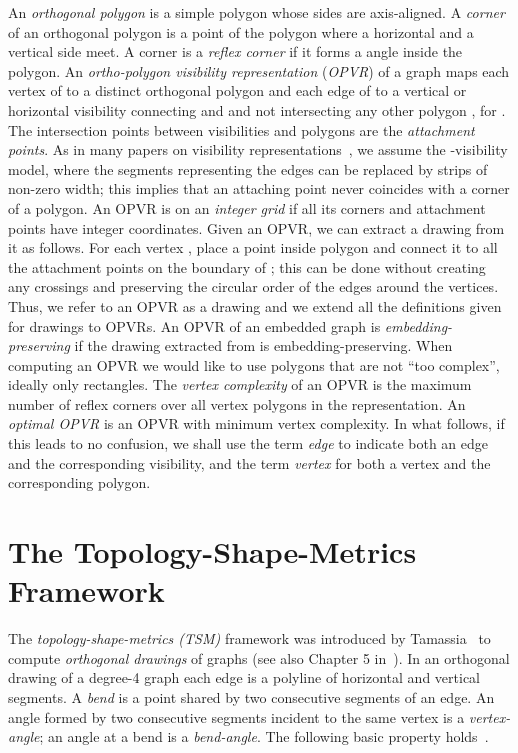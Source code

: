 \documentclass{article}
\newcommand{\opvr}{OPVR\xspace}
\begin{document}
An \emph{orthogonal polygon} is a simple polygon whose sides are axis-aligned. A \emph{corner} of an orthogonal polygon is a point of the polygon where a horizontal and a vertical side meet. A corner is a \emph{reflex corner} if it forms a  angle inside the polygon. An \emph{ortho-polygon visibility representation} (\emph{\opvr}) of a graph  maps each vertex  of  to a distinct orthogonal polygon  and each edge  of  to a vertical or horizontal visibility connecting  and  and not intersecting any other polygon , for . The intersection points between visibilities and polygons are the \emph{attachment points}. As in many papers on visibility representations~\cite{DBLP:journals/ipl/KantLTT97,DBLP:conf/stacs/StreinuW03,TamassiaTollis86,DBLP:conf/compgeom/Wismath85}, we assume the -visibility model, where the segments representing the edges can be replaced by strips of non-zero width; this implies that an attaching point never coincides with a corner of a polygon. An \opvr is on an \emph{integer grid} if all its corners and attachment points have integer coordinates.
Given an \opvr, we can extract a drawing from it as follows. For each vertex , place a point inside polygon  and connect it to all the attachment points on the boundary of ; this can be done without creating any crossings and preserving the circular order of the edges around the vertices. Thus, we refer to an \opvr as a drawing and we extend all the definitions given for drawings to {\opvr}s. An \opvr  of an embedded graph is \emph{embedding-preserving} if the drawing extracted from  is embedding-preserving. 
When computing an \opvr we would like to use polygons that are not ``too complex'', ideally only rectangles. 
The \emph{vertex complexity} of an \opvr is the maximum number of reflex corners over all vertex polygons in the representation. An \emph{optimal \opvr} is an \opvr with minimum vertex complexity. In what follows, if this leads to no confusion, we shall use the term \emph{edge} to indicate both an edge and the corresponding visibility, and the term \emph{vertex} for both a vertex and the corresponding polygon.      

\section{The Topology-Shape-Metrics Framework}\label{se:tsm}

The \emph{topology-shape-metrics (TSM)} framework was introduced by Tamassia~\cite{t-eggmnb-87} to compute \emph{orthogonal drawings} of graphs (see also Chapter 5 in~\cite{dett-gdavg-99}). In an orthogonal drawing of a degree-4 graph each edge is a polyline of horizontal and vertical segments. A \emph{bend} is a point shared by two consecutive segments of an edge. An angle formed by two consecutive segments incident to the same vertex is a \emph{vertex-angle}; an angle at a bend is a \emph{bend-angle}. The following basic property holds~\cite{dett-gdavg-99}.
\end{document}

